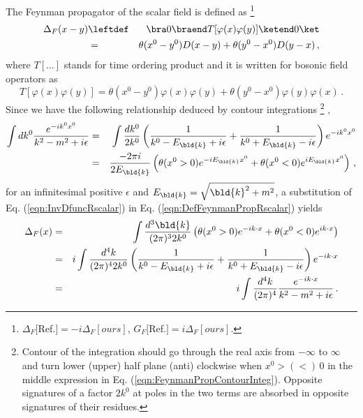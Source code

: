 The Feynman propagator of the scalar field is defined as 
\footnote{%
$\Delta_F[$Ref.\cite{ref:Mandl-Shaw}$] = -i\Delta_F[ours]$,
$G_F[$Ref.\cite{ref:Itzykson-Zuber}$] = i \Delta_F[ours]$.
}%
\begin{eqnarray}
\Delta_F(x-y)
&\leftdef&
\bra 0 \braend T[\varphi(x) \varphi(y)] \ketend 0 \ket
\nonumber\\
&=&
\theta(x^0 - y^0) D(x-y)
+
\theta(y^0 - x^0) D(y-x)\,,
\label{eqn:DefFeynmanPropRscalar}
\end{eqnarray}
where $T[\dots]$ stands for time ordering product and it is written for
bosonic field operators as
\begin{equation}
T[\varphi(x) \varphi(y)] =
\theta(x^0 - y^0)\varphi(x) \varphi(y)
+
\theta(y^0 - x^0)\varphi(y) \varphi(x)\,.
\label{eqn:definitionTprodBoson}
\end{equation}
Since we have the following relationship
deduced by contour integrations
\footnote{%
Contour of the integration should go through the real axis from $- \infty$ to $\infty$ and
turn lower (upper) half plane (anti) clockwise when $x^0  > (<)\, 0$ in the 
middle expression in Eq. (\ref{eqn:FeynmanPropContourInteg}).
Opposite signatures of a factor $2k^0$ at poles in the two terms are absorbed
in opposite signatures of their residues.
}%
,
\begin{eqnarray}
\int d k^0 \frac{e^{-ik^0x^0}}{k^2 - m^2 + i\epsilon}
&=&
\int \frac{dk^0}{2k^0}
\left(
\frac{1}{k^0 - E_{\bld{k}} + i\epsilon
}
+
\frac{1}{k^0 + E_{\bld{k}} - i\epsilon}
\right)
e^{-ik^0x^0}
\nonumber\\
&=&
\frac{-2\pi i}{2E_{\bld{k}}}
\left(
\theta(x^0 > 0) e^{-iE_{\bld{k}}x^0}
+
\theta(x^0 < 0) e^{iE_{\bld{k}}x^0}
\right)\,,
\nonumber\\
\label{eqn:FeynmanPropContourInteg}
\end{eqnarray}
for an infinitesimal positive $\epsilon$ and $E_{\bld{k}} = \sqrt{\bld{k}^2 + m^2}$,
a substitution of Eq. (\ref{eqn:InvDfuncRscalar}) in Eq. (\ref{eqn:DefFeynmanPropRscalar})
yields
\begin{eqnarray}
\Delta_F(x)
&=&
\int \frac{d^3\bld{k}}{(2\pi)^3 2k^0}
\left(
\theta(x^0 > 0) e^{-i k\cdot x}
+
\theta(x^0 < 0) e^{i k\cdot x}
\right)
\nonumber\\
&=&
i \int \frac{d^4 k}{(2\pi)^4 2 k^0}
\left(
\frac{1}{k^0 - E_{\bld{k}} + i\epsilon
}
+
\frac{1}{k^0 + E_{\bld{k}} - i\epsilon}
\right)
e^{-ik \cdot x}
\nonumber\\
&=&
i \int \frac{d^4 k}{(2\pi)^4}
\frac{e^{-ik \cdot x}}{k^2 - m^2 + i\epsilon}\,.
\end{eqnarray}
